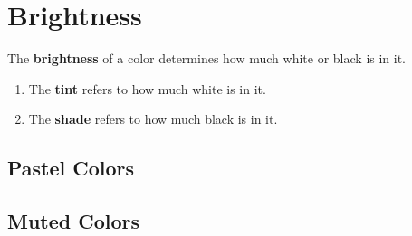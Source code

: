 \section{Brightness}

  \begin{definition}[Brightness]
    \label{def:brightness}
    The \textbf{brightness} of a color determines how much white or black is in it. 
    \begin{enumerate}
      \item The \textbf{tint} refers to how much white is in it. 
      \item The \textbf{shade} refers to how much black is in it. 
    \end{enumerate}
  \end{definition}

\subsection{Pastel Colors}

\subsection{Muted Colors}
